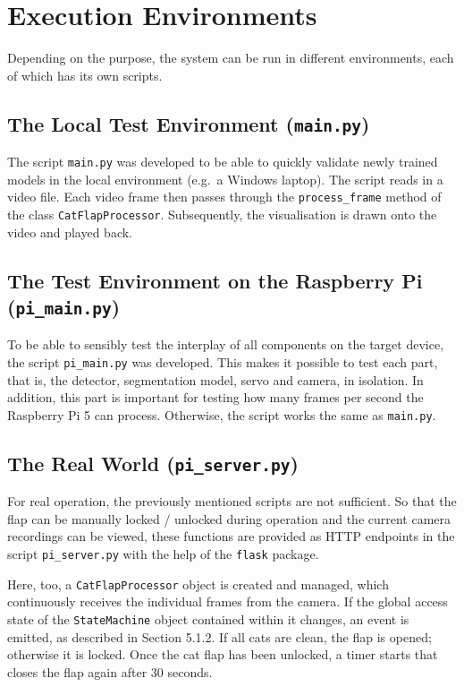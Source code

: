 \section{Execution Environments}
Depending on the purpose, the system can be run in different environments, each of which has its own scripts.

\subsection{The Local Test Environment (\texttt{main.py})}
The script \texttt{main.py} was developed to be able to quickly validate newly trained models in the local environment (e.g.\ a Windows laptop). The script reads in a video file. Each video frame then passes through the \texttt{process\_frame} method of the class \texttt{CatFlapProcessor}. Subsequently, the visualisation is drawn onto the video and played back.

\subsection{The Test Environment on the Raspberry Pi (\texttt{pi\_main.py})}
To be able to sensibly test the interplay of all components on the target device, the script \texttt{pi\_main.py} was developed. This makes it possible to test each part, that is, the detector, segmentation model, servo and camera, in isolation. In addition, this part is important for testing how many frames per second the Raspberry Pi 5 can process. Otherwise, the script works the same as \texttt{main.py}.

\subsection{The Real World (\texttt{pi\_server.py})}
For real operation, the previously mentioned scripts are not sufficient. So that the flap can be manually locked / unlocked during operation and the current camera recordings can be viewed, these functions are provided as HTTP endpoints in the script \texttt{pi\_server.py} with the help of the \texttt{flask} package.

Here, too, a \texttt{CatFlapProcessor} object is created and managed, which continuously receives the individual frames from the camera. If the global access state of the \texttt{StateMachine} object contained within it changes, an event is emitted, as described in Section 5.1.2. If all cats are clean, the flap is opened; otherwise it is locked. Once the cat flap has been unlocked, a timer starts that closes the flap again after 30 seconds.




